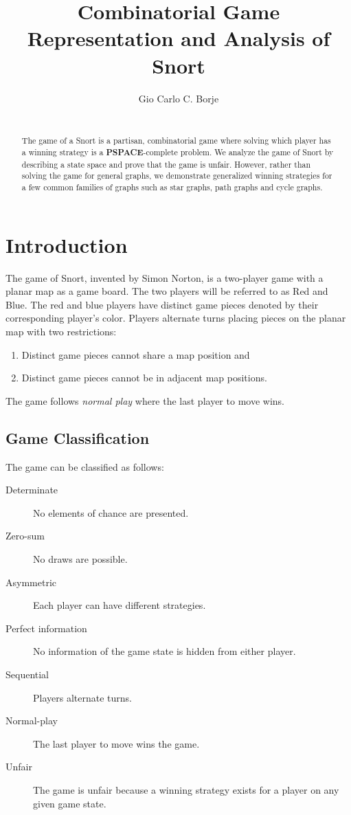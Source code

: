 \documentclass{sig-alternate}
\begin{document}
\title{Combinatorial Game Representation and Analysis of Snort}
\author{
	Gio Carlo C. Borje \\
	 \\
}
\maketitle

\begin{abstract}
The game of a Snort is a partisan, combinatorial game where solving which
player has a winning strategy is a \textbf{PSPACE}-complete problem. We
analyze the game of Snort by describing a state space and prove that the
game is unfair. However, rather than solving the game for general graphs,
we demonstrate generalized winning strategies for a few common families of
graphs such as star graphs, path graphs and cycle graphs.
\end{abstract}

\section{Introduction}

The game of Snort, invented by Simon Norton, is a two-player game with a planar
map as a game board. The two players will be referred to as Red and Blue. The
red and blue players have distinct game pieces denoted by their corresponding
player's color. Players alternate turns placing pieces on the planar map with
two restrictions:
\begin{enumerate}
	\item Distinct game pieces cannot share a map position and
	\item Distinct game pieces cannot be in adjacent map positions.
\end{enumerate}
The game follows \emph{normal play} where the last player to move wins.

\subsection{Game Classification}

The game can be classified as follows:
\begin{description}
	\item [Determinate] No elements of chance are presented.
	\item [Zero-sum] No draws are possible.
	\item [Asymmetric] Each player can have different strategies.
	\item [Perfect information] No information of the game state is hidden from
		either player.
	\item [Sequential] Players alternate turns.
	\item [Normal-play] The last player to move wins the game.
	\item [Unfair] The game is unfair because a winning strategy exists for a
		player on any given game state.
\end{description}
\end{document}
